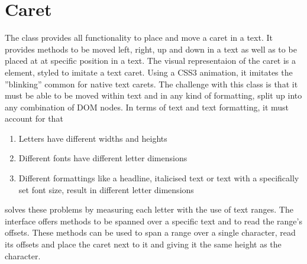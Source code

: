 


\section{Caret}
\label{subsec:caret}

The  class provides all functionality to place and move a caret in a text. It provides methods to be moved left, right, up and down in a text as well as to be placed at at specific position in a text. The visual representaion of the caret is a  element, styled to imitate a text caret. Using a CSS3 animation, it imitates the ''blinking'' common for native text carets. The challenge with this class is that it must be able to be moved within text and in any kind of formatting, split up into any combination of DOM nodes. In terms of text and text formatting, it must account for that

\begin{enumerate}
\item Letters have different widths and heights
\item Different fonts have different letter dimensions
\item Different formattings like a headline, italicised text or text with a specifically set font size, result in different letter dimensions
\end{enumerate}

 solves these problems by measuring each letter with the use of text ranges. The  interface offers methods to be spanned over a specific text and to read the range's offsets. These methods can be used to span a range over a single character, read its offsets and place the caret next to it and giving it the same height as the character.

